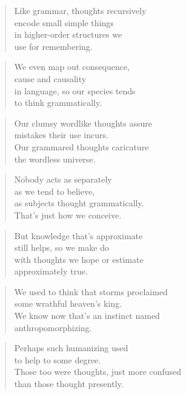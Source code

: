 \documentclass[14pt,a4paper]{article}
\begin{document}
\begin{verse}
Like grammar, thoughts recursively\\
encode small simple things\\
in higher-order structures we\\
use for remembering.
\end{verse}

\begin{verse}
We even map out consequence,\\
cause and causality\\
in language, so our species tends\\
to think grammatically.
\end{verse}

\begin{verse}
Our clumsy wordlike thoughts assure\\
mistakes their use incurs.\\
Our grammared thoughts caricature\\
the wordless universe.
\end{verse}

\begin{verse}
Nobody acts as separately\\
as we tend to believe,\\
as subjects thought grammatically.\\
That’s just how we conceive.
\end{verse}

\begin{verse}
But knowledge that’s approximate\\
still helps, so we make do\\
with thoughts we hope or estimate\\
approximately true.
\end{verse}

\begin{verse}
We used to think that storms proclaimed\\
some wrathful heaven’s king.\\
We know now that’s an instinct named\\
anthropomorphizing.
\end{verse}

\begin{verse}
Perhaps such humanizing used\\
to help to some degree.\\
Those too were thoughts, just more confused\\
than those thought presently.
\end{verse}
\end{document}
